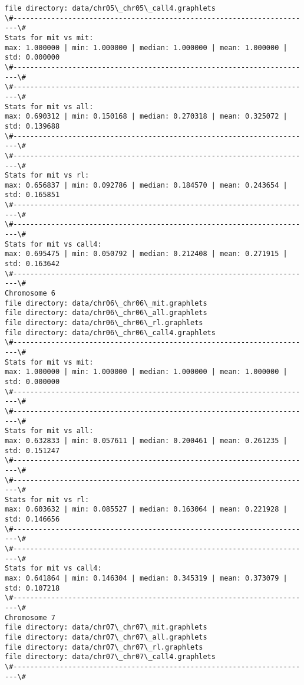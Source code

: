 \documentclass[11pt]{article}
\begin{document}
\begin{Verbatim}[commandchars=\\\{\}]
file directory: data/chr05\_chr05\_call4.graphlets
\#-----------------------------------------------------------------------\#
Stats for mit vs mit: 
max: 1.000000 | min: 1.000000 | median: 1.000000 | mean: 1.000000 | std: 0.000000
\#-----------------------------------------------------------------------\#
\#-----------------------------------------------------------------------\#
Stats for mit vs all: 
max: 0.690312 | min: 0.150168 | median: 0.270318 | mean: 0.325072 | std: 0.139688
\#-----------------------------------------------------------------------\#
\#-----------------------------------------------------------------------\#
Stats for mit vs rl: 
max: 0.656837 | min: 0.092786 | median: 0.184570 | mean: 0.243654 | std: 0.165851
\#-----------------------------------------------------------------------\#
\#-----------------------------------------------------------------------\#
Stats for mit vs call4: 
max: 0.695475 | min: 0.050792 | median: 0.212408 | mean: 0.271915 | std: 0.163642
\#-----------------------------------------------------------------------\#
Chromosome 6
file directory: data/chr06\_chr06\_mit.graphlets
file directory: data/chr06\_chr06\_all.graphlets
file directory: data/chr06\_chr06\_rl.graphlets
file directory: data/chr06\_chr06\_call4.graphlets
\#-----------------------------------------------------------------------\#
Stats for mit vs mit: 
max: 1.000000 | min: 1.000000 | median: 1.000000 | mean: 1.000000 | std: 0.000000
\#-----------------------------------------------------------------------\#
\#-----------------------------------------------------------------------\#
Stats for mit vs all: 
max: 0.632833 | min: 0.057611 | median: 0.200461 | mean: 0.261235 | std: 0.151247
\#-----------------------------------------------------------------------\#
\#-----------------------------------------------------------------------\#
Stats for mit vs rl: 
max: 0.603632 | min: 0.085527 | median: 0.163064 | mean: 0.221928 | std: 0.146656
\#-----------------------------------------------------------------------\#
\#-----------------------------------------------------------------------\#
Stats for mit vs call4: 
max: 0.641864 | min: 0.146304 | median: 0.345319 | mean: 0.373079 | std: 0.107218
\#-----------------------------------------------------------------------\#
Chromosome 7
file directory: data/chr07\_chr07\_mit.graphlets
file directory: data/chr07\_chr07\_all.graphlets
file directory: data/chr07\_chr07\_rl.graphlets
file directory: data/chr07\_chr07\_call4.graphlets
\#-----------------------------------------------------------------------\#

\end{Verbatim}
\end{document}
